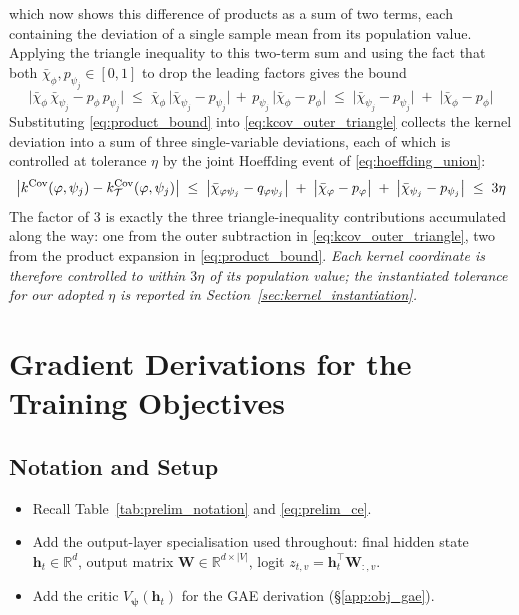 \documentclass[titlepage,a4paper,11pt]{report}
\begin{document}
    which now shows this difference of products as a sum of two terms, each containing the deviation of a single sample mean from its population value. Applying the triangle inequality to this two-term sum and using the fact that both $\bar\chi_\phi, p_{\psi_j} \in [0, 1]$ to drop the leading factors gives the bound
    \begin{equation}\label{eq:product_bound}
        \bigl|\bar\chi_\phi\, \bar\chi_{\psi_j} - p_\phi\, p_{\psi_j}\bigr| \;\le\; \bar\chi_\phi\,\bigl|\bar\chi_{\psi_j} - p_{\psi_j}\bigr| \, + \, p_{\psi_j}\,\bigl|\bar\chi_\phi - p_\phi\bigr| \;\le\; \bigl|\bar\chi_{\psi_j} - p_{\psi_j}\bigr| \;+\; \bigl|\bar\chi_\phi - p_\phi\bigr|
    \end{equation}
    Substituting \eqref{eq:product_bound} into \eqref{eq:kcov_outer_triangle} collects the kernel deviation into a sum of three single-variable deviations, each of which is controlled at tolerance $\eta$ by the joint Hoeffding event of \eqref{eq:hoeffding_union}:
    \begin{equation}\label{eq:kcov_propagation}
        \bigl| k^{\mathrm{Cov}}(\varphi, \psi_j) - k^{\mathrm{Cov}}_\mathcal{T}(\varphi, \psi_j) \bigr| \;\le\; \bigl|\bar\chi_{\varphi\psi_j} - q_{\varphi\psi_j}\bigr| \;+\; \bigl|\bar\chi_\varphi - p_\varphi\bigr| \;+\; \bigl|\bar\chi_{\psi_j} - p_{\psi_j}\bigr| \;\le\; 3\eta
    \end{equation}
    The factor of $3$ is exactly the three triangle-inequality contributions accumulated along the way: one from the outer subtraction in \eqref{eq:kcov_outer_triangle}, two from the product expansion in \eqref{eq:product_bound}. \emph{Each kernel coordinate is therefore controlled to within $3\eta$ of its population value; the instantiated tolerance for our adopted $\eta$ is reported in Section~\ref{sec:kernel_instantiation}.}


\section{Gradient Derivations for the Training Objectives}\label{app:objective_gradients}

    \subsection{Notation and Setup}\label{app:obj_setup}
    \begin{itemize}
        \item Recall Table~\ref{tab:prelim_notation} and \eqref{eq:prelim_ce}.
        \item Add the output-layer specialisation used throughout: final hidden state
              $\bm h_t \in \mathbb{R}^d$, output matrix $\bm W \in \mathbb{R}^{d\times|V|}$,
              logit $z_{t,v} = \bm h_t^\top \bm W_{:,v}$.
        \item Add the critic $V_{\bm\psi}(\bm h_t)$ for the GAE derivation (§\ref{app:obj_gae}).
    \end{itemize}
\end{document}
